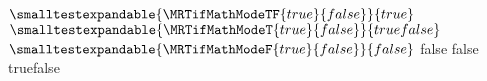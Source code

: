 \documentclass[]{article}
\begin{document}
$\smalltestexpandable{\MRTifMathModeTF{true}{false}} {true}$
$\smalltestexpandable{\MRTifMathModeT{true}{false}}  {true{false}}$
$\smalltestexpandable{\MRTifMathModeF{true}{false}}  {{false}}$
 {false}
  {{false}}
  {true{false}}
\end{document}
